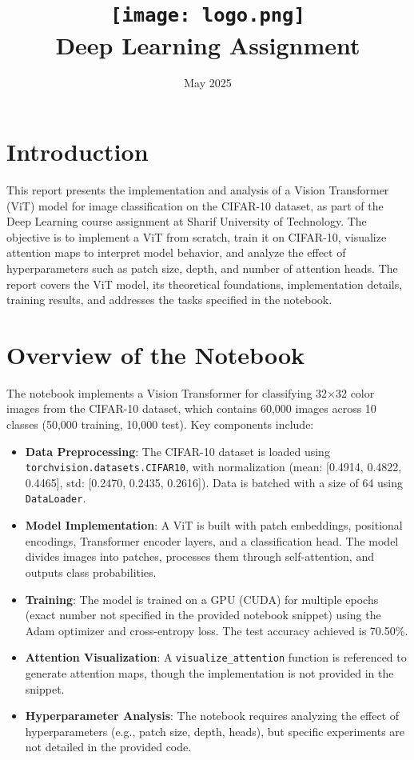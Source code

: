 \documentclass{article}
\title{
    \texttt{[image: logo.png]} \\
    Deep Learning Assignment \\ \exerciseset
}
\author{\FirstAuthor}
\date{May 2025}
\begin{document}
\maketitle

\section*{Introduction}
This report presents the implementation and analysis of a Vision Transformer (ViT) model for image classification on the CIFAR-10 dataset, as part of the Deep Learning course assignment at Sharif University of Technology. The objective is to implement a ViT from scratch, train it on CIFAR-10, visualize attention maps to interpret model behavior, and analyze the effect of hyperparameters such as patch size, depth, and number of attention heads. The report covers the ViT model, its theoretical foundations, implementation details, training results, and addresses the tasks specified in the notebook.

\section{Overview of the Notebook}
The notebook implements a Vision Transformer for classifying 32×32 color images from the CIFAR-10 dataset, which contains 60,000 images across 10 classes (50,000 training, 10,000 test). Key components include:

\begin{itemize}
    \item \textbf{Data Preprocessing}: The CIFAR-10 dataset is loaded using \texttt{torchvision.datasets.CIFAR10}, with normalization (mean: [0.4914, 0.4822, 0.4465], std: [0.2470, 0.2435, 0.2616]). Data is batched with a size of 64 using \texttt{DataLoader}.
    \item \textbf{Model Implementation}: A ViT is built with patch embeddings, positional encodings, Transformer encoder layers, and a classification head. The model divides images into patches, processes them through self-attention, and outputs class probabilities.
    \item \textbf{Training}: The model is trained on a GPU (CUDA) for multiple epochs (exact number not specified in the provided notebook snippet) using the Adam optimizer and cross-entropy loss. The test accuracy achieved is 70.50\%.
    \item \textbf{Attention Visualization}: A \texttt{visualize\_attention} function is referenced to generate attention maps, though the implementation is not provided in the snippet.
    \item \textbf{Hyperparameter Analysis}: The notebook requires analyzing the effect of hyperparameters (e.g., patch size, depth, heads), but specific experiments are not detailed in the provided code.
\end{itemize}
\end{document}
